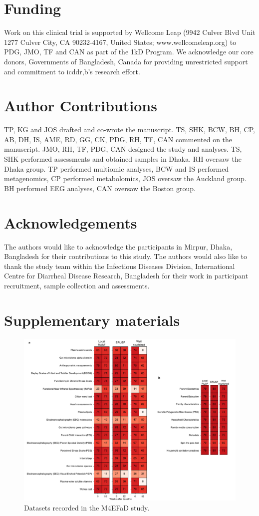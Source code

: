 \documentclass{article}
\begin{document}
\section*{Funding}
Work on this clinical trial is supported by Wellcome Leap (9942 Culver Blvd Unit 1277 Culver City, CA 90232-4167, United States; www.wellcomeleap.org) to PDG, JMO, TF and CAN as part of the 1kD Program.
We acknowledge our core donors, Governments of Bangladesh, Canada for providing unrestricted support and commitment to icddr,b's research effort.

\section*{Author Contributions}
TP, KG and JOS drafted and co-wrote the manuscript.
TS, SHK, BCW, BH, CP, AB, DH, IS, AME, RD, GG, CK, PDG, RH, TF, CAN commented on the manuscript.
JMO, RH, TF, PDG, CAN designed the study and analyses.
TS, SHK performed assessments and obtained samples in Dhaka.
RH oversaw the Dhaka group.
TP performed multiomic analyses, BCW and IS performed metagenomics, CP performed metabolomics, JOS oversaw the Auckland group.
BH performed EEG analyses, CAN oversaw the Boston group.

\section*{Acknowledgements}
The authors would like to acknowledge the participants in Mirpur, Dhaka, Bangladesh for their contributions to this study.
The authors would also like to thank the study team within the Infectious Diseases Division, International Centre for Diarrheal Disease Research, Bangladesh for their work in participant recruitment, sample collection and assessments.



\newpage

\section*{Supplementary materials}
\begin{figure}[!htb]
\centering
\includegraphics[scale=0.8]{figures/newalldata}
	\caption[Datasets recoreded in the M4EFaD study]{
		Datasets recorded in the M4EFaD study.
	}
\label{fig:FigureS1}
\end{figure}
\end{document}
